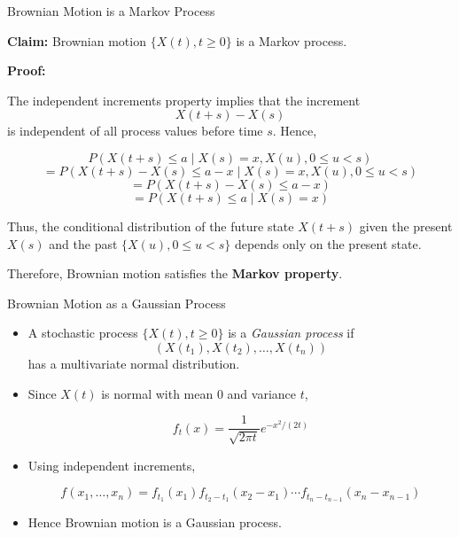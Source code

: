 \documentclass{beamer}
\begin{document}
\begin{frame}{Brownian Motion is a Markov Process}

\textbf{Claim:} Brownian motion $\{X(t), t \ge 0\}$ is a Markov process.

\vspace{0.3cm}

\textbf{Proof:}

The independent increments property implies that the increment
\[
X(t+s) - X(s)
\]
is independent of all process values before time $s$.
Hence,

\[
P(X(t+s) \le a \mid X(s)=x, X(u), 0 \le u < s)
\]
\[
= P(X(t+s)-X(s) \le a-x \mid X(s)=x, X(u), 0 \le u < s)
\]
\[
= P(X(t+s)-X(s) \le a-x)
\]
\[
= P(X(t+s) \le a \mid X(s)=x)
\]

\vspace{0.3cm}

Thus, the conditional distribution of the future state $X(t+s)$ given the
present $X(s)$ and the past $\{X(u), 0 \le u < s\}$ depends only on the
present state.

\vspace{0.2cm}

Therefore, Brownian motion satisfies the \textbf{Markov property}.

\end{frame}

\begin{frame}{Brownian Motion as a Gaussian Process}

\begin{itemize}

\item<1-> A stochastic process $\{X(t), t \ge 0\}$ is a \textit{Gaussian process} if
\[
(X(t_1), X(t_2), \ldots, X(t_n))
\]
has a multivariate normal distribution.

\item<2-> Since $X(t)$ is normal with mean $0$ and variance $t$,

\[
f_t(x) = \frac{1}{\sqrt{2\pi t}} e^{-x^2/(2t)}
\]

\item<3-> Using independent increments,

\[
f(x_1,\dots,x_n)
=
f_{t_1}(x_1)
f_{t_2-t_1}(x_2-x_1)
\cdots
f_{t_n-t_{n-1}}(x_n-x_{n-1})
\]

\item<4-> Hence Brownian motion is a Gaussian process.

\end{itemize}

\end{frame}
\end{document}
